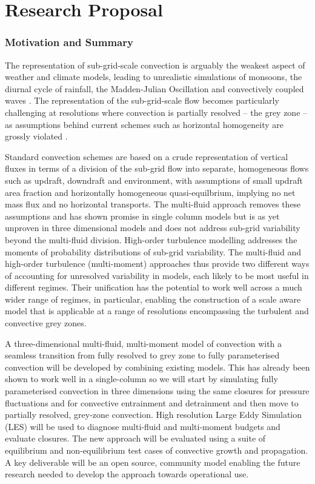 \documentclass[11pt,a4paper]{article}
\begin{document}


\newpage

\part{Research Proposal}

\section{Motivation and Summary}

The representation of sub-grid-scale convection is arguably the weakest aspect of weather and climate models, leading to unrealistic simulations of monsoons, the diurnal cycle of rainfall, the Madden-Julian Oscillation and convectively coupled waves  \cite[]{SAB+13,HPB+14}. The representation of the sub-grid-scale flow becomes particularly challenging at resolutions where convection is partially resolved -- the grey zone -- as assumptions behind current schemes such as horizontal homogeneity are grossly violated \cite[eg.][]{GG05}.

Standard convection schemes are based on a crude representation of vertical fluxes in terms of a division of the sub-grid flow into separate, homogeneous flows such as updraft, downdraft and environment, with assumptions of small updraft area fraction and horizontally homogeneous quasi-equilbrium, implying no net mass flux and no horizontal transports. The multi-fluid approach removes these assumptions and has shown promise in single column models but is as yet unproven in three dimensional models and does not address sub-grid variability beyond the multi-fluid division. High-order turbulence modelling addresses the moments of probability distributions of sub-grid variability. The multi-fluid and high-order turbulence (multi-moment) approaches thus provide two different ways of accounting for unresolved variability in models, each likely to be most useful in different regimes. Their unification has the potential to work well across a much wider range of regimes, in particular, enabling the construction of a scale aware model that is applicable at a range of resolutions encompassing the turbulent and convective grey zones.

A three-dimensional multi-fluid, multi-moment model of convection with a seamless transition from fully resolved to grey zone to fully parameterised convection will be developed by combining existing models. This has already been shown to work well in a single-column so we will start by simulating fully parameterised convection in three dimensions using the same closures for pressure fluctuations and for convective entrainment and detrainment and then move to partially resolved, grey-zone convection. High resolution Large Eddy Simulation (LES) will be used to diagnose multi-fluid and multi-moment budgets and evaluate closures. The new approach will be evaluated using a suite of equilibrium and non-equilibrium test cases of convective growth and propagation. A key deliverable will be an open source, community model enabling the future research needed to develop the approach towards operational use.
\end{document}
